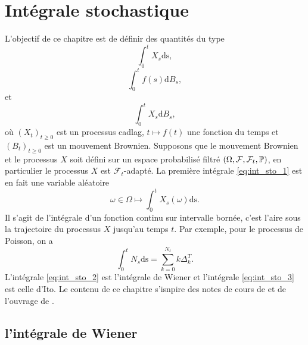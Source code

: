 \chapter{Intégrale stochastique}\label{chap:sto_calc}
L'objectif de ce chapitre est de définir des quantités du type
\begin{equation}\label{eq:int_sto_1}
\int_0^tX_s\text{ds},
\end{equation}
\begin{equation}\label{eq:int_sto_2}
\int_0^tf(s)\text{d}B_s,
\end{equation}
et 
\begin{equation}\label{eq:int_sto_3}
\int_0^tX_s\text{d}B_s,
\end{equation}
où $(X_t)_{t\geq 0}$ est un processus cadlag, $t\mapsto f(t)$ une fonction du temps et $(B_t)_{t\geq 0}$ est un mouvement Brownien. Supposons que le mouvement Brownien et le processus $X$ soit défini sur un espace probabilisé filtré $(\Omega,\mathcal{F}, \mathcal{F}_t, \mathbb{P})$, en particulier le processus $X$ est $\mathcal{F}_t$-adapté. La première intégrale \eqref{eq:int_sto_1} est en fait une variable aléatoire 
$$
\omega\in\Omega\mapsto\int_0^tX_s(\omega)\text{ds}.
$$
Il s'agit de l'intégrale d'un fonction continu sur intervalle bornée, c'est l'aire sous la trajectoire du processus $X$ jusqu'au temps $t$. Par exemple, pour le processus de Poisson, on a 
$$
\int_0^t N_s \text{ds} = \sum_{k=0}^{N_t} k\Delta^T_k.
$$
L'intégrale \eqref{eq:int_sto_2} est l'intégrale de Wiener et l'intégrale \eqref{eq:int_sto_3} est celle d'Ito. Le contenu de ce chapitre s'isnpire des notes de cours de \citet{MJB06} et de l'ouvrage de \citet{Dobrow2016}.
\section{l'intégrale de Wiener}\label{sec:wiener_integral}
